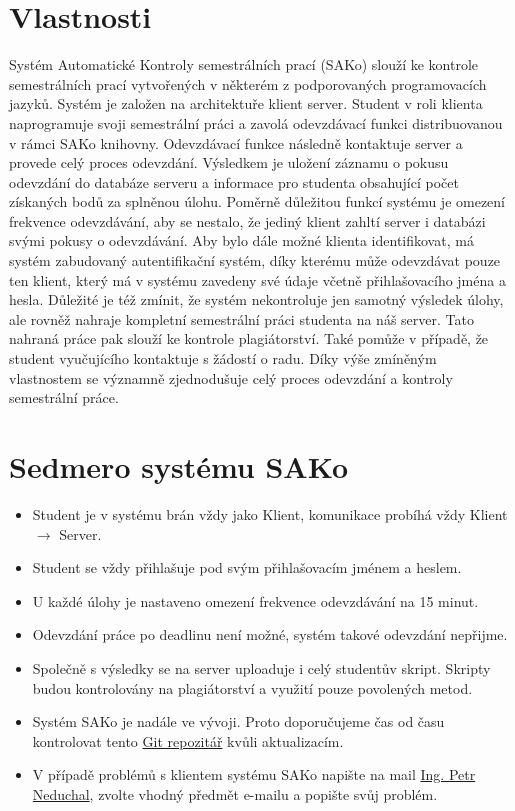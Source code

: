 \documentclass[12pt, a4paper]{article}
\begin{document}
\section*{Vlastnosti}
\par{Systém Automatické Kontroly semestrálních prací (SAKo) slouží ke kontrole semestrálních prací vytvořených v některém z podporovaných programovacích jazyků. Systém je založen na architektuře klient server. Student v roli klienta naprogramuje svoji semestrální práci a zavolá odevzdávací funkci distribuovanou v rámci SAKo knihovny. Odevzdávací funkce následně kontaktuje server a provede celý proces odevzdání. Výsledkem je uložení záznamu o pokusu odevzdání do databáze serveru a informace pro studenta obsahující počet získaných bodů za splněnou úlohu. Poměrně důležitou funkcí systému je omezení frekvence odevzdávání, aby se nestalo, že jediný klient zahltí server i databázi svými pokusy o odevzdávání. Aby bylo dále možné klienta identifikovat, má systém zabudovaný autentifikační systém, díky kterému může odevzdávat pouze ten klient, který má v systému zavedeny své údaje včetně přihlašovacího jména a hesla. Důležité je též zmínit, že systém nekontroluje jen samotný výsledek úlohy, ale rovněž nahraje kompletní semestrální práci studenta na náš server. Tato nahraná práce pak slouží ke kontrole plagiátorství. Také pomůže v případě, že student vyučujícího kontaktuje s žádostí o radu. Díky výše zmíněným vlastnostem se významně zjednodušuje celý proces odevzdání a kontroly semestrální práce.}

\section*{Sedmero systému SAKo}
\begin{itemize}
	\item {Student je v systému brán vždy jako Klient, komunikace probíhá vždy Klient $\rightarrow$ Server.}
	\item {Student se vždy přihlašuje pod svým přihlašovacím jménem a heslem.}
	\item {U každé úlohy je nastaveno omezení frekvence odevzdávání na 15 minut.}
	\item {Odevzdání práce po deadlinu není možné, systém takové odevzdání nepřijme.}
	\item {Společně s výsledky se na server uploaduje i celý studentův skript. Skripty budou kontrolovány na plagiátorství a využití pouze povolených metod.}
	\item {Systém SAKo je nadále ve vývoji. Proto doporučujeme čas od času kontrolovat tento \href{http://github.com/neduchal/SAKo}{Git repozitář} kvůli aktualizacím.}
	\item {V případě problémů s klientem systému SAKo napište na mail  \href{mailto:neduchal@kky.zcu.cz}{Ing. Petr Neduchal}, zvolte vhodný předmět e-mailu a popište svůj problém.}			
\end{itemize}
\end{document}
